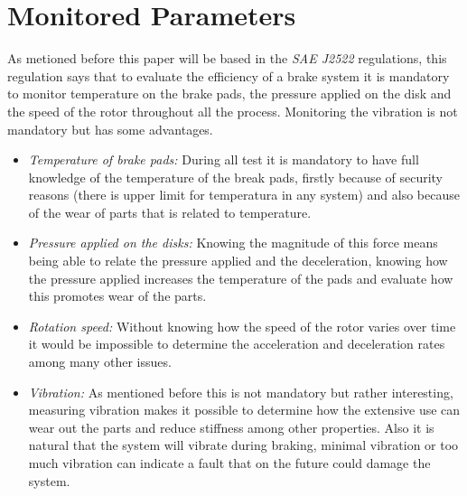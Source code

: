 \section{Monitored Parameters}\label{sec:monitored-parameters}
		As metioned before this paper will be based in the \textit{SAE J2522} regulations, this regulation says that to evaluate the efficiency of a brake system it is mandatory to monitor temperature on the brake pads, the pressure applied on the disk and the speed of the rotor throughout all the process. Monitoring the vibration is not mandatory but has some advantages.

	\begin{itemize}
		\item\textit{Temperature of brake pads: } During all test it is mandatory to have full knowledge of the temperature of the break pads, firstly because of security reasons (there is upper limit for temperatura in any system) and also because of the wear of parts that is related to temperature.\label{itm:temperature-of-brake-pads}
		\item\textit{Pressure applied on the disks: } Knowing the magnitude of this force means being able to relate the pressure applied and the deceleration, knowing how the pressure applied increases the temperature of the pads and evaluate how this promotes wear of the parts.\label{itm:pressure-applied-on-the-disks}
		\item\textit{Rotation speed: } Without knowing how the speed of the rotor varies over time it would be impossible to determine the acceleration and deceleration rates among many other issues.\label{itm:rotation-speed}
		\item\textit{Vibration: } As mentioned before this is not mandatory but rather interesting, measuring vibration makes it possible to determine how the extensive use can wear out the parts and reduce stiffness among other properties. Also it is natural that the system will vibrate during braking, minimal vibration or too much vibration can indicate a fault that on the future could damage the system.\label{itm:vibration}
	\end{itemize}

